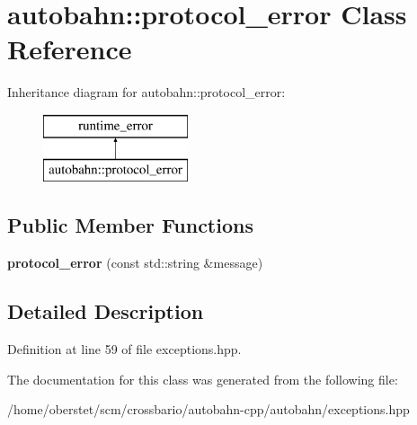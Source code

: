 \hypertarget{classautobahn_1_1protocol__error}{}\section{autobahn\+:\+:protocol\+\_\+error Class Reference}
\label{classautobahn_1_1protocol__error}
Inheritance diagram for autobahn\+:\+:protocol\+\_\+error\+:\begin{figure}[H]
\begin{center}
\leavevmode
\includegraphics[height=2.000000cm]{classautobahn_1_1protocol__error}
\end{center}
\end{figure}
\subsection*{Public Member Functions}
\begin{DoxyCompactItemize}
\item 
{\bfseries protocol\+\_\+error} (const std\+::string \&message)\hypertarget{classautobahn_1_1protocol__error_aa8c6e9c1631c24733036b4dee887c961}{}\label{classautobahn_1_1protocol__error_aa8c6e9c1631c24733036b4dee887c961}

\end{DoxyCompactItemize}


\subsection{Detailed Description}


Definition at line 59 of file exceptions.\+hpp.



The documentation for this class was generated from the following file\+:\begin{DoxyCompactItemize}
\item 
/home/oberstet/scm/crossbario/autobahn-\/cpp/autobahn/exceptions.\+hpp\end{DoxyCompactItemize}
